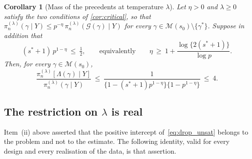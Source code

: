 \documentclass[aos]{imsart}
\theoremstyle{plain}
\newtheorem{corollary}{Corollary}[section]
\theoremstyle{definition}
\begin{document}
    \begin{corollary}[Mass of the precedents at temperature $\lambda$]
        \label{cor:prec}
        Let $\eta>0$ and $\lambda\geq0$ satisfy the two conditions of
        \cref{cor:critical}, so that
        $\pi_n^{(\lambda)}(\gamma\mid Y)\leq
        p^{-\eta}\,\pi_n^{(\lambda)}(\mathcal{G}(\gamma)\mid Y)$ for every
        $\gamma\in\mathscr{M}(s_0)\setminus\{\gamma^{\ast}\}$. Suppose in
        addition that
        \begin{equation}
            \label{eq:etamin}
            (s^{\ast}+1)\,p^{1-\eta}\ \leq\ \tfrac12,
            \qquad\text{equivalently}\qquad
            \eta\ \geq\ 1+\frac{\log\{2(s^{\ast}+1)\}}{\log p} .
        \end{equation}
        Then, for every $\gamma\in\mathscr{M}(s_0)$,
        \begin{equation}
            \label{eq:precmass}
            \frac{\pi_n^{(\lambda)}[\Lambda(\gamma)\mid Y]}
            {\pi_n^{(\lambda)}(\gamma\mid Y)}
            \ \leq\ \frac{1}
            {\bigl\{1-(s^{\ast}+1)p^{1-\eta}\bigr\}
            \bigl\{1-p^{1-\eta}\bigr\}}
            \ \leq\ 4 .
        \end{equation}
    \end{corollary}


    \subsection{The restriction on $\lambda$ is real}

    Item~(ii) above asserted that the positive intercept
    of~\eqref{eq:drop_unsat} belongs to the problem and not to the estimate.
    The following identity, valid for every design and every realisation of
    the data, is that assertion.
\end{document}
